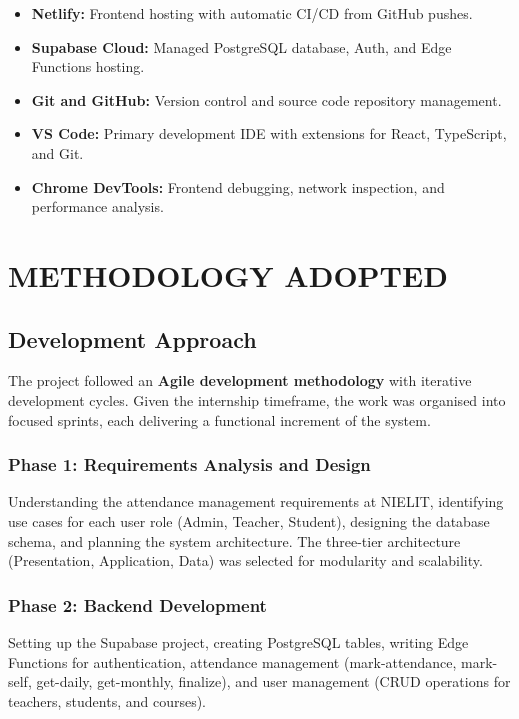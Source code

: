 \documentclass{SOICTthesis}
\begin{document}
\begin{itemize}
    \item \textbf{Netlify:} Frontend hosting with automatic CI/CD from GitHub pushes.
    \item \textbf{Supabase Cloud:} Managed PostgreSQL database, Auth, and Edge Functions hosting.
    \item \textbf{Git and GitHub:} Version control and source code repository management.
    \item \textbf{VS Code:} Primary development IDE with extensions for React, TypeScript, and Git.
    \item \textbf{Chrome DevTools:} Frontend debugging, network inspection, and performance analysis.
\end{itemize}


\chapter{METHODOLOGY ADOPTED}
\label{ch:methodology}

\section{Development Approach}
\label{sec:dev_approach}

The project followed an \textbf{Agile development methodology} with iterative development cycles. Given the internship timeframe, the work was organised into focused sprints, each delivering a functional increment of the system.

\subsection{Phase 1: Requirements Analysis and Design}
Understanding the attendance management requirements at NIELIT, identifying use cases for each user role (Admin, Teacher, Student), designing the database schema, and planning the system architecture. The three-tier architecture (Presentation, Application, Data) was selected for modularity and scalability.

\subsection{Phase 2: Backend Development}
Setting up the Supabase project, creating PostgreSQL tables, writing Edge Functions for authentication, attendance management (mark-attendance, mark-self, get-daily, get-monthly, finalize), and user management (CRUD operations for teachers, students, and courses).
\end{document}

